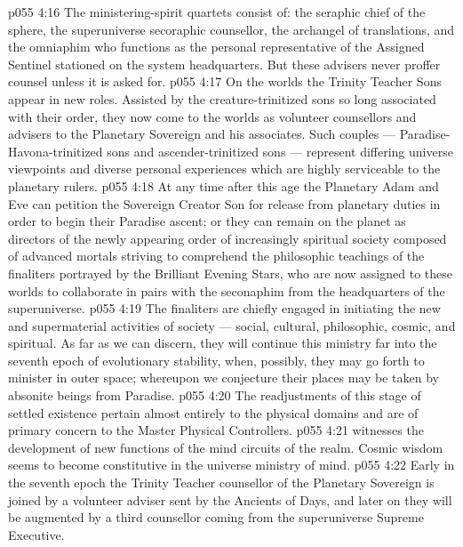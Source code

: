 \vs p055 4:16 The ministering\hyp{}spirit quartets consist of: the seraphic chief of the sphere, the superuniverse secoraphic counsellor, the archangel of translations, and the omniaphim who functions as the personal representative of the Assigned Sentinel stationed on the system headquarters. But these advisers never proffer counsel unless it is asked for.
\vs p055 4:17 \bibnobreakspace {} On the worlds the Trinity Teacher Sons appear in new roles. Assisted by the creature\hyp{}trinitized sons so long associated with their order, they now come to the worlds as volunteer counsellors and advisers to the Planetary Sovereign and his associates. Such couples --- Paradise\hyp{}Havona\hyp{}trinitized sons and ascender\hyp{}trinitized sons --- represent differing universe viewpoints and diverse personal experiences which are highly serviceable to the planetary rulers.
\vs p055 4:18 At any time after this age the Planetary Adam and Eve can petition the Sovereign Creator Son for release from planetary duties in order to begin their Paradise ascent; or they can remain on the planet as directors of the newly appearing order of increasingly spiritual society composed of advanced mortals striving to comprehend the philosophic teachings of the finaliters portrayed by the Brilliant Evening Stars, who are now assigned to these worlds to collaborate in pairs with the seconaphim from the headquarters of the superuniverse.
\vs p055 4:19 The finaliters are chiefly engaged in initiating the new and supermaterial activities of society --- social, cultural, philosophic, cosmic, and spiritual. As far as we can discern, they will continue this ministry far into the seventh epoch of evolutionary stability, when, possibly, they may go forth to minister in outer space; whereupon we conjecture their places may be taken by absonite beings from Paradise.
\vs p055 4:20 \bibnobreakspace {} The readjustments of this stage of settled existence pertain almost entirely to the physical domains and are of primary concern to the Master Physical Controllers.
\vs p055 4:21 \bibnobreakspace {} witnesses the development of new functions of the mind circuits of the realm. Cosmic wisdom seems to become constitutive in the universe ministry of mind.
\vs p055 4:22 \bibnobreakspace {} Early in the seventh epoch the Trinity Teacher counsellor of the Planetary Sovereign is joined by a volunteer adviser sent by the Ancients of Days, and later on they will be augmented by a third counsellor coming from the superuniverse Supreme Executive.
